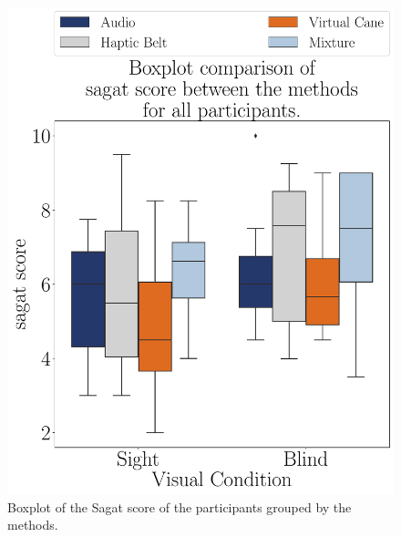 \begin{figure}[!htb]
    \centering
    \begin{minipage}{0.45\textwidth}
        \centering
        \includegraphics[width = \textwidth]{Resultados/Sagat/Figuras/pdf/boxplot_sagat_4_scene.pdf}
        \caption{Boxplot of the Sagat score of the participants grouped by the methods.}
        \label{fig:boxplot_sagat_4_scene}
    \end{minipage}
    \begin{minipage}{0.075\textwidth}
        \hfill
    \end{minipage}
    \begin{minipage}{0.45\textwidth}
        \centering

\end{minipage}
\end{figure}
